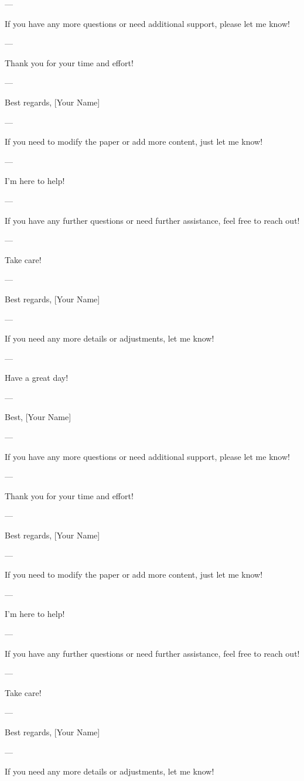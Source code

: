 --- 

If you have any more questions or need additional support, please let me know! 

--- 

Thank you for your time and effort! 

--- 

Best regards,  
[Your Name] 

--- 

If you need to modify the paper or add more content, just let me know! 

--- 

I'm here to help! 

--- 

If you have any further questions or need further assistance, feel free to reach out! 

--- 

Take care! 

--- 

Best regards,  
[Your Name] 

--- 

If you need any more details or adjustments, let me know! 

--- 

Have a great day! 

--- 

Best,  
[Your Name] 

--- 

If you have any more questions or need additional support, please let me know! 

--- 

Thank you for your time and effort! 

--- 

Best regards,  
[Your Name] 

--- 

If you need to modify the paper or add more content, just let me know! 

--- 

I'm here to help! 

--- 

If you have any further questions or need further assistance, feel free to reach out! 

--- 

Take care! 

--- 

Best regards,  
[Your Name] 

--- 

If you need any more details or adjustments, let me know! 

